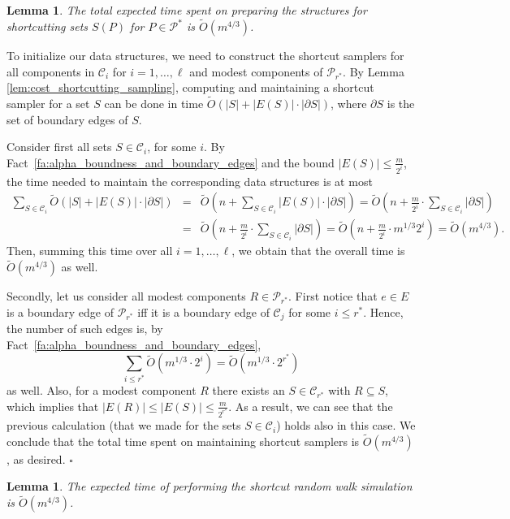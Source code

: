 \documentclass[11pt, letterpaper]{article}
\newtheorem{lemma}[theorem]{Lemma}
\newenvironment{proof}{\noindent{\bf Proof:}\hspace*{1em}}{\qed\bigskip}
\newcommand{\qed}{\hfill\ensuremath{\square}}
\newcommand{\cC}{\mathcal{C}}
\newcommand{\cP}{\mathcal{P}}
\newcommand{\tO}{\widetilde{O}}
\begin{document}
\begin{lemma}\label{lem:preparation_cost}
The total expected time spent on preparing the structures for shortcutting sets $S(P)$ for $P\in \cP^*$ is $\tO(m^{4/3})$.
\end{lemma}
\begin{proof}
To initialize our data structures, we need to construct the shortcut samplers for all components in $\cC_i$ for $i=1,\dots,\ell$ and modest components of $\cP_{r^*}$. By Lemma \ref{lem:cost_shortcutting_sampling}, computing and maintaining a shortcut sampler for a set $S$ can be done in time $\tO(|S|+|E(S)|\cdot |\partial S|)$, where $\partial S$ is the set of boundary edges of $S$.

Consider first all sets $S\in \cC_i$, for some $i$. By Fact~\ref{fa:alpha_boundness_and_boundary_edges} and the bound $|E(S)| \le \frac{m}{2^{i}}$, the time needed to maintain the corresponding data structures is at most
\begin{eqnarray*}
\sum_{S \in \cC_i}\tO(|S|+|E(S)|\cdot |\partial S|)&=&\tO\left(n+\sum_{S \in \cC_i}|E(S)|\cdot |\partial S|\right)=\tO\left(n+\frac{m}{2^{i}} \cdot \sum_{S \in \cC_i} |\partial S|\right)\\
&=&\tO\left(n+\frac{m}{2^{i}} \cdot \sum_{S \in \cC_i} |\partial S|\right)=\tO\left(n+\frac{m}{2^{i}} \cdot m^{1/3}2^{i}\right)=\tO(m^{4/3}).
\end{eqnarray*}
Then, summing this time over all $i=1,\ldots,\ell$, we obtain that the overall time is $\tO(m^{4/3})$ as well.

Secondly, let us consider all modest components $R \in \cP_{r^*}$. First notice that $e \in E$ is a boundary edge of $\cP_{r^*}$ iff it is a boundary edge of $\cC_j$ for some $i \le r^*$. Hence, the number of such edges is, by Fact~\ref{fa:alpha_boundness_and_boundary_edges},
\[
\sum_{i \le r^*} \tO\left( m^{1/3} \cdot 2^i \right) = \tO(m^{1/3} \cdot 2^{r^*})
\]
as well. Also, for a modest component $R$ there exists an $S \in \cC_{r^*}$ with $R \subseteq S$, which implies that $|E(R)| \le |E(S)| \le \frac{m}{2^{r^*}}$. As a result, we can see that the previous calculation (that we made for the sets $S\in \cC_i$) holds also in this case. We conclude that the total time spent on maintaining shortcut samplers is $\tO(m^{4/3})$, as desired.
\end{proof}


\begin{lemma}\label{lem:walking_cost}
The expected time of performing the shortcut random walk simulation is $\tO(m^{4/3})$.
\end{lemma}
\end{document}
